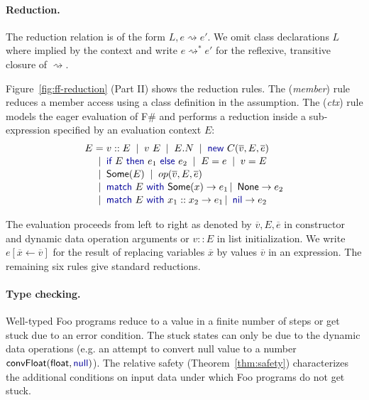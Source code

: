 \documentclass[10pt]{sigplanconf}
\newcommand{\kvd}[1]{\textnormal{\textcolor{kvdclr}{\sffamily #1}}}
\newcommand{\ident}[1]{\textnormal{\sffamily #1}}
\newcommand{\lsep}[0]{\;\; | \;\;}
\newcommand{\narrow}[1]{\hspace{-0.7em} #1 \hspace{-0.7em}}
\newcommand{\reduce}{\rightsquigarrow}
\begin{document}

\paragraph{Reduction.}
The reduction relation is of the form $L, e \reduce e'$. We omit class declarations
$L$ where implied by the context and write $e \reduce^{*} e'$ for
the reflexive, transitive closure of $\reduce$.

Figure~\ref{fig:ff-reduction} (Part II) shows the reduction rules.  The (\emph{member}) rule reduces
a member access using a class definition in the assumption. The (\emph{ctx}) rule models the eager
evaluation of F\# and performs a reduction inside a sub-expression specified by an evaluation
context $E$:
%
\begin{equation*}
\begin{array}{rcl}
 E &\narrow{=}& v::E \lsep v~E \lsep E.N \lsep \kvd{new}~C(\overline{v}, E, \overline{e})\\[0.1em]
   &\narrow{|}&  \kvd{if}~E~\kvd{then}~e_1~\kvd{else}~e_2  \lsep E = e \lsep v = E \\[0.1em]
   &\narrow{|}& \ident{Some}(E) \lsep op(\overline{v}, E, \overline{e})\\[0.1em]
   &\narrow{|}& \kvd{match}~E~\kvd{with}~\ident{Some}(x) \rightarrow e_1 \,|\, \ident{None} \rightarrow e_2 \\[0.1em]
   &\narrow{|}& \kvd{match}~E~\kvd{with}~x_1 :: x_2 \rightarrow e_1 \,|\, \kvd{nil} \rightarrow e_2
\end{array}
\end{equation*}

\noindent
The evaluation proceeds from left to right as denoted by $\overline{v}, E, \overline{e}$ in
constructor and dynamic data operation arguments or $v::E$ in list initialization.
We write $e[\overline{x} \leftarrow \overline{v}]$ for the result of replacing variables $\overline{x}$ by
values $\overline{v}$ in an expression. The remaining six rules
give standard reductions.


\paragraph{Type checking.}
Well-typed Foo programs reduce to a value in a finite number of steps or get stuck due to an
error condition. The stuck states can only be due to the dynamic data operations (e.g. an attempt
to convert \kvd{null} value to a number $\ident{convFloat}(\ident{float},\kvd{null})$). The relative safety (Theorem~\ref{thm:safety})
characterizes the additional conditions on input data under which Foo programs do not get stuck.
\end{document}

